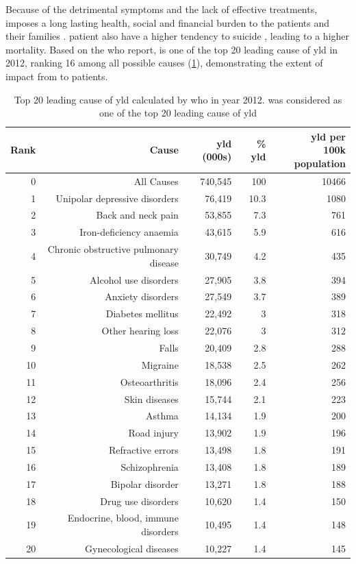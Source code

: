 	Because of the detrimental symptoms and the lack of effective treatments,  imposes a long lasting health, social and financial burden to the patients and their families \citep{Knapp2004}. 
	 patient also have a higher tendency to suicide  \citep{Saha2007}, leading to a higher mortality.
	Based on the \gls{who} report,  is one of the top 20 leading cause of \gls{yld} in 2012, ranking 16 among all possible causes (\cref{tab:whoYLD}), demonstrating the extent of impact from  to patients.
	\begin{table}[ht]
		\centering
		\caption[Top 20 leading cause of ]{Top 20 leading cause of \gls{yld} calculated by \gls{who} in year 2012.
			 was considered as one of the top 20 leading cause of \gls{yld}\citep{Geneva2013}}
		\begin{tabular}{rrrrr}
			\toprule
			Rank  & Cause & \gls{yld} (000s) & \% \gls{yld} & \specialcell[b]{\gls{yld} per \\100k population}\\
			\midrule
			0     & All Causes & 740,545 & 100   & 10466 \\
			1     & Unipolar depressive disorders & 76,419 & 10.3  & 1080 \\
			2     & Back and neck pain & 53,855 & 7.3   & 761 \\
			3     & Iron-deficiency anaemia & 43,615 & 5.9   & 616 \\
			4     & Chronic obstructive pulmonary disease & 30,749 & 4.2   & 435 \\
			5     & Alcohol use disorders & 27,905 & 3.8   & 394 \\
			6     & Anxiety disorders & 27,549 & 3.7   & 389 \\
			7     & Diabetes mellitus & 22,492 & 3     & 318 \\
			8     & Other hearing loss & 22,076 & 3     & 312 \\
			9     & Falls & 20,409 & 2.8   & 288 \\
			10    & Migraine & 18,538 & 2.5   & 262 \\
			11    & Osteoarthritis & 18,096 & 2.4   & 256 \\
			12    & Skin diseases & 15,744 & 2.1   & 223 \\
			13    & Asthma & 14,134 & 1.9   & 200 \\
			14    & Road injury & 13,902 & 1.9   & 196 \\
			15    & Refractive errors & 13,498 & 1.8   & 191 \\
			16    & Schizophrenia & 13,408 & 1.8   & 189 \\
			17    & Bipolar disorder & 13,271 & 1.8   & 188 \\
			18    & Drug use disorders & 10,620 & 1.4   & 150 \\
			19    & Endocrine, blood, immune disorders & 10,495 & 1.4   & 148 \\
			20    & Gynecological diseases & 10,227 & 1.4   & 145 \\
			\bottomrule
		\end{tabular}%
		\label{tab:whoYLD}%
	\end{table}%

